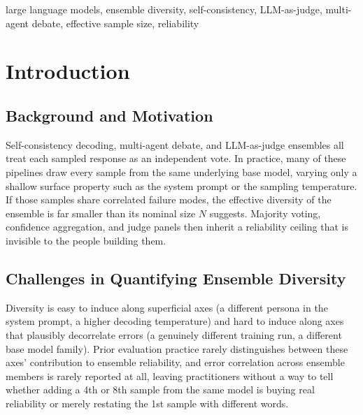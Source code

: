 \documentclass[conference]{IEEEtran}
\begin{document}
\begin{IEEEkeywords}
large language models, ensemble diversity, self-consistency, LLM-as-judge,
multi-agent debate, effective sample size, reliability
\end{IEEEkeywords}

\section{Introduction}

\subsection{Background and Motivation}
Self-consistency decoding, multi-agent debate, and LLM-as-judge ensembles
all treat each sampled response as an independent vote. In practice, many
of these pipelines draw every sample from the same underlying base model,
varying only a shallow surface property such as the system prompt or the
sampling temperature. If those samples share correlated failure modes, the
effective diversity of the ensemble is far smaller than its nominal size
$N$ suggests. Majority voting, confidence aggregation, and judge panels
then inherit a reliability ceiling that is invisible to the people
building them.

\subsection{Challenges in Quantifying Ensemble Diversity}
Diversity is easy to induce along superficial axes (a different persona in
the system prompt, a higher decoding temperature) and hard to induce along
axes that plausibly decorrelate errors (a genuinely different training
run, a different base model family). Prior evaluation practice rarely
distinguishes between these axes' contribution to ensemble reliability, and
error correlation across ensemble members is rarely reported at all,
leaving practitioners without a way to tell whether adding a 4th or 8th
sample from the same model is buying real reliability or merely restating
the 1st sample with different words.
\end{document}

